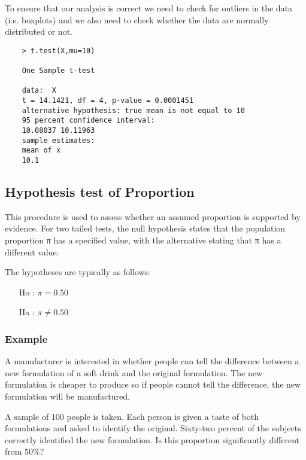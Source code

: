 To ensure that our analysis is correct we need to check for
outliers in the data (i.e. boxplots) and we also need to check
whether the data are normally distributed or not.

\begin{framed}
	\begin{verbatim}
	> t.test(X,mu=10)
	
	One Sample t-test
	
	data:  X 
	t = 14.1421, df = 4, p-value = 0.0001451
	alternative hypothesis: true mean is not equal to 10 
	95 percent confidence interval:
	10.08037 10.11963 
	sample estimates:
	mean of x 
	10.1 
	\end{verbatim}
\end{framed}




\newpage




\subsection{Hypothesis test of Proportion}
This procedure is used to assess whether an assumed proportion is supported by evidence. For two tailed tests, the null hypothesis states that the population proportion  π has a specified value, with the alternative stating that π has a different value. 

The hypotheses are typically as follows:   

\begin{itemize}
	\item[Ho] : $\pi = 0.50$
	\item[Ha] : $\pi \neq 0.50$
\end{itemize}

\subsubsection{Example}
A manufacturer is interested in whether people can tell the difference between a new formulation of a soft drink and the original formulation. The new formulation is cheaper to produce so if people cannot tell the difference, the new formulation will be manufactured. 

A sample of 100 people is taken. Each person is given a taste of both formulations and asked to identify the original. Sixty-two percent of the subjects correctly identified the new formulation. Is this proportion significantly different from $50\%$? 

